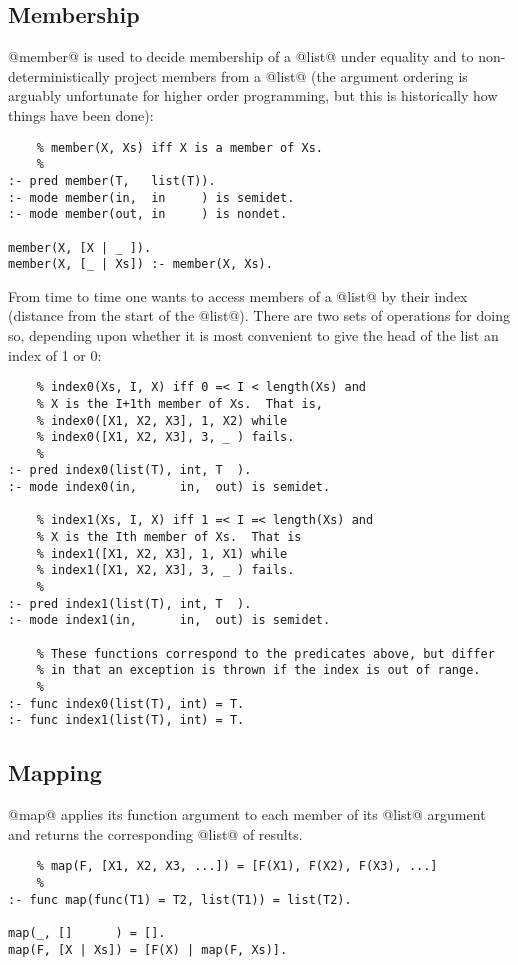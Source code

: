 \subsection{Membership}


@member@ is used to decide membership of a @list@ under equality and to
non-deterministically project members from a @list@ (the argument ordering
is arguably unfortunate for higher order programming, but this is
historically how things have been done):
\begin{verbatim}
    % member(X, Xs) iff X is a member of Xs.
    %
:- pred member(T,   list(T)).
:- mode member(in,  in     ) is semidet.
:- mode member(out, in     ) is nondet.

member(X, [X | _ ]).
member(X, [_ | Xs]) :- member(X, Xs).
\end{verbatim}
From time to time one wants to access members of a @list@ by their index
(\ie distance from the start of the @list@).  There are two sets of
operations for doing so, depending upon whether it is most convenient to
give the head of the list an index of 1 or 0:
\begin{verbatim}
    % index0(Xs, I, X) iff 0 =< I < length(Xs) and
    % X is the I+1th member of Xs.  That is,
    % index0([X1, X2, X3], 1, X2) while
    % index0([X1, X2, X3], 3, _ ) fails.
    %
:- pred index0(list(T), int, T  ).
:- mode index0(in,      in,  out) is semidet.

    % index1(Xs, I, X) iff 1 =< I =< length(Xs) and
    % X is the Ith member of Xs.  That is
    % index1([X1, X2, X3], 1, X1) while
    % index1([X1, X2, X3], 3, _ ) fails.
    %
:- pred index1(list(T), int, T  ).
:- mode index1(in,      in,  out) is semidet.

    % These functions correspond to the predicates above, but differ
    % in that an exception is thrown if the index is out of range.
    %
:- func index0(list(T), int) = T.
:- func index1(list(T), int) = T.
\end{verbatim}

\subsection{Mapping}

@map@ applies its function argument to each member of its @list@ argument
and returns the corresponding @list@ of results.
\begin{verbatim}
    % map(F, [X1, X2, X3, ...]) = [F(X1), F(X2), F(X3), ...]
    %
:- func map(func(T1) = T2, list(T1)) = list(T2).

map(_, []      ) = [].
map(F, [X | Xs]) = [F(X) | map(F, Xs)].
\end{verbatim}

